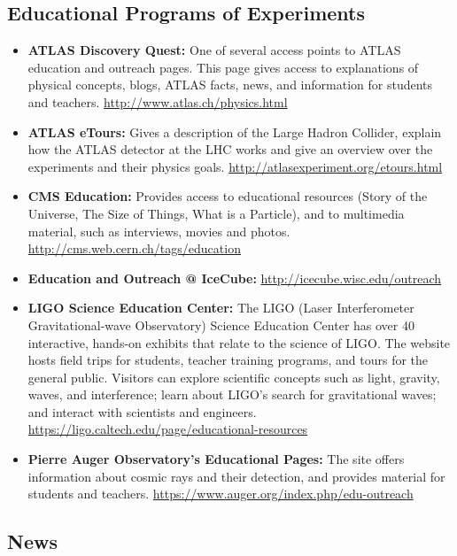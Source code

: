 \subsection{Educational Programs of
Experiments}\label{educational-programs-of-experiments}

\begin{itemize}
\item
  \textbf{ATLAS Discovery Quest:} One of several access points to ATLAS
  education and outreach pages. This page gives access to explanations
  of physical concepts, blogs, ATLAS facts, news, and information for
  students and teachers. \url{http://www.atlas.ch/physics.html}
\item
  \textbf{ATLAS eTours:} Gives a description of the Large Hadron
  Collider, explain how the ATLAS detector at the LHC works and give an
  overview over the experiments and their physics goals.
  \url{http://atlasexperiment.org/etours.html}
\item
  \textbf{CMS Education:} Provides access to educational resources
  (Story of the Universe, The Size of Things, What is a Particle), and
  to multimedia material, such as interviews, movies and photos.
  \url{http://cms.web.cern.ch/tags/education}
\item
  \textbf{Education and Outreach @ IceCube:}
  \url{http://icecube.wisc.edu/outreach}
\item
  \textbf{LIGO Science Education Center:} The LIGO (Laser Interferometer
  Gravitational-wave Observatory) Science Education Center has over 40
  interactive, hands-on exhibits that relate to the science of LIGO. The
  website hosts field trips for students, teacher training programs, and
  tours for the general public. Visitors can explore scientific concepts
  such as light, gravity, waves, and interference; learn about LIGO's
  search for gravitational waves; and interact with scientists and
  engineers. \url{https://ligo.caltech.edu/page/educational-resources}
\item
  \textbf{Pierre Auger Observatory's Educational Pages:} The site offers
  information about cosmic rays and their detection, and provides
  material for students and teachers.
  \url{https://www.auger.org/index.php/edu-outreach}
\end{itemize}

\subsection{News}\label{news}

